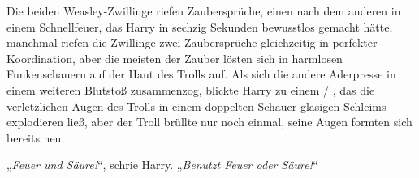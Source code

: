 Die beiden Weasley-Zwillinge riefen Zaubersprüche, einen nach dem anderen in einem Schnellfeuer, das Harry in sechzig Sekunden bewusstlos gemacht hätte, manchmal riefen die Zwillinge zwei Zaubersprüche gleichzeitig in perfekter Koordination, aber die meisten der Zauber lösten sich in harmlosen Funkenschauern auf der Haut des Trolls auf. Als sich die andere Aderpresse in einem weiteren Blutstoß zusammenzog, blickte Harry zu einem  / , das die verletzlichen Augen des Trolls in einem doppelten Schauer glasigen Schleims explodieren ließ, aber der Troll brüllte nur noch einmal, seine Augen formten sich bereits neu.

„\emph{Feuer und Säure!}“, schrie Harry.
„\emph{Benutzt Feuer oder Säure!}“

